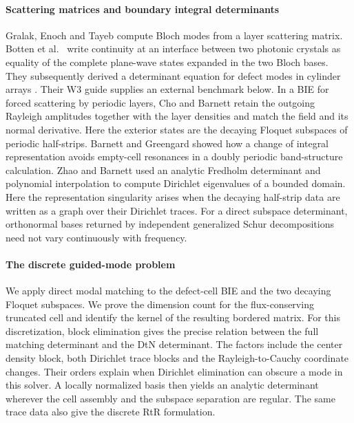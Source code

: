 \paragraph{Scattering matrices and boundary integral determinants}
Gralak, Enoch and Tayeb \cite{GralakEnochTayeb2002} compute Bloch modes
from a layer scattering matrix. Botten et al.\ \cite[eq.~(38)]{BottenEtAl2004}
write continuity at an interface between two photonic crystals as equality
of the complete plane-wave states expanded in the two Bloch bases. They
subsequently derived a determinant equation for defect modes in cylinder
arrays \cite{BottenEtAl2006}. Their W3 guide supplies an external benchmark
below. In a BIE for forced scattering by periodic layers, Cho and Barnett
\cite[eqs.~(47) and~(53)]{ChoBarnett2015} retain the outgoing Rayleigh
amplitudes together with the layer densities and match the field and its
normal derivative. Here the exterior states are the decaying Floquet
subspaces of periodic half-strips.
Barnett and Greengard \cite{BarnettGreengard2010} showed how a change of
integral representation avoids empty-cell resonances in a doubly periodic
band-structure calculation. Zhao and Barnett \cite{ZhaoBarnett2015} used an
analytic Fredholm determinant and polynomial interpolation to compute
Dirichlet eigenvalues of a bounded domain. Here the representation
singularity arises when the decaying half-strip data are written as a graph
over their Dirichlet traces. For a direct subspace determinant, orthonormal bases returned by independent
generalized Schur decompositions need not vary continuously with frequency.

\paragraph{The discrete guided-mode problem}
We apply direct modal matching to the defect-cell BIE and the two decaying
Floquet subspaces. We prove the dimension count for the flux-conserving
truncated cell and identify the kernel of the resulting bordered matrix.
For this discretization, block elimination gives the precise relation
between the full matching determinant and the DtN determinant. The factors include the center density block, both Dirichlet
trace blocks and the Rayleigh-to-Cauchy coordinate changes. Their orders
explain when Dirichlet elimination can obscure a mode in this solver.
A locally normalized basis then yields an analytic
determinant wherever the cell assembly and the subspace separation are
regular. The same trace data also give the discrete RtR formulation.

